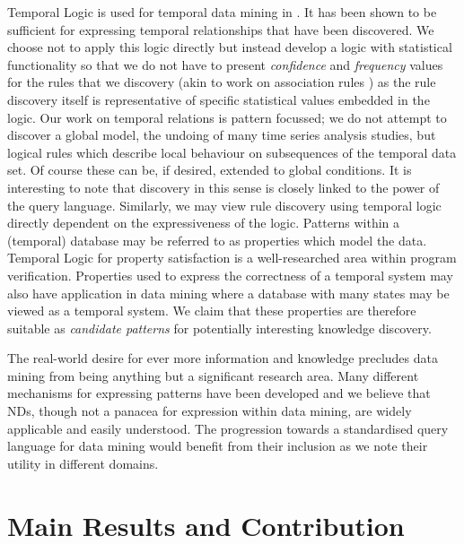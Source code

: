 Temporal Logic is used for temporal data mining in
\cite{pt96,bt98}. It has been shown to be sufficient for expressing
temporal relationships that have been discovered. We choose not to
apply this logic directly but instead develop a logic with statistical
functionality so that we do not have to present {\em confidence} and
{\em frequency} values for the rules that we discovery (akin to work
on association rules \cite{ais93,kmrtv94,hkmt95}) as the rule discovery
itself is representative of specific statistical values embedded in
the logic. Our work on temporal relations is pattern focussed; we do
not attempt to discover a global model, the undoing of many time
series analysis studies, but logical rules which describe local behaviour
on subsequences of the temporal data set. Of course these can be, if
desired, extended to global conditions.
It is interesting to note that discovery in this
sense is closely linked to the power of the query language. Similarly,
we may view rule discovery using temporal logic directly dependent on
the expressiveness of the logic.
Patterns within a (temporal) database may be referred to as properties
which model the data. Temporal Logic for property satisfaction is a
well-researched area within program verification. Properties used to
express the correctness of a temporal system may also have application
in data mining where a database with many states may be viewed as a
temporal system. We claim that these properties are therefore suitable
as {\em candidate patterns} for potentially interesting knowledge
discovery. 

\medskip

The real-world desire for ever more information and knowledge
precludes data mining from being anything but a significant research
area. Many different mechanisms for expressing patterns have been
developed and we believe that NDs, though not a panacea for expression
within data mining, are widely applicable and easily understood. The
progression towards a standardised query language for data mining
would benefit from their inclusion as we note their utility in
different domains.

\section{Main Results and Contribution}\label{sec:int_contrib}


